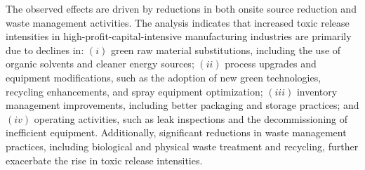 \documentclass[12pt, english]{article}
\begin{document}
    The observed effects are driven by reductions in both onsite source reduction and waste management activities. The analysis indicates that increased toxic release intensities in high-profit-capital-intensive manufacturing industries are primarily due to declines in: $(i)$ green raw material substitutions, including the use of organic solvents and cleaner energy sources; $(ii)$ process upgrades and equipment modifications, such as the adoption of new green technologies, recycling enhancements, and spray equipment optimization; $(iii)$ inventory management improvements, including better packaging and storage practices; and $(iv)$ operating activities, such as leak inspections and the decommissioning of inefficient equipment. Additionally, significant reductions in waste management practices, including biological and physical waste treatment and recycling, further exacerbate the rise in toxic release intensities.
\end{document}
